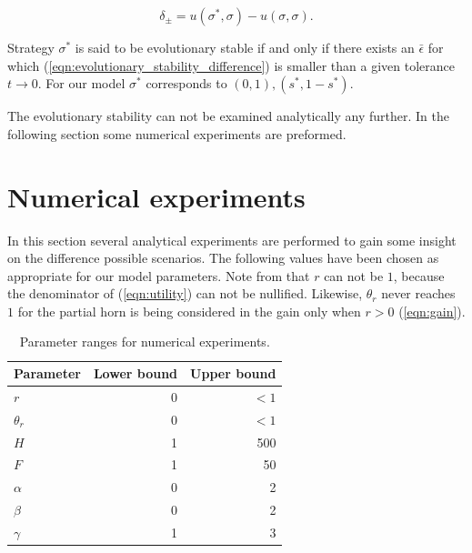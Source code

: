 \documentclass[10pt]{article}
\begin{document}
\begin{equation}\label{eqn:evolutionary_stability_difference}
	 \delta_{\pm} = u(\sigma^*, \sigma) - u(\sigma, \sigma).
\end{equation}

Strategy \(\sigma^*\) is said to be evolutionary stable if and only if there exists
an \(\bar{\epsilon}\) for which (\ref{eqn:evolutionary_stability_difference}) is
smaller than a given tolerance \(t \rightarrow 0\).  For our model \(\sigma^*\) 
corresponds to \((0, 1), (s^*, 1 - s^*)\).

The evolutionary stability can not be examined analytically any further. In the 
following section some numerical experiments are preformed. 

\section{Numerical experiments}\label{section:numerical_experiments}

In this section several analytical experiments are performed to gain some insight 
on the difference possible scenarios. The following values have been chosen as
appropriate for our model parameters. Note from that \(r\) can not be \(1\), because 
the denominator of (\ref{eqn:utility}) can not be nullified. Likewise,  \(\theta_r\)
never reaches \(1\) for the partial horn is being considered in the gain only when 
\(r>0\) (\ref{eqn:gain}). 

\begin{table}[!hbtp]
	\begin{center}
      \begin{tabular}{lrr}
            \toprule
            Parameter    	& Lower bound & Upper bound\\
            \midrule
            \(r\)				& 0				& \(< 1\)		\\
            \(\theta_r\)    	& 0				&  \(< 1\)		\\
            \(H\)              	& 1				& 500			\\
            \(F\)              	& 1				& 50			\\
            \(\alpha\)      	& 0				& 2				\\
            \(\beta\)        	& 0  	            & 2				\\
            \(\gamma\)  	& 1				& 3				\\
            \bottomrule
      \end{tabular}
      \caption{Parameter ranges for numerical experiments.}
      \label{tbl:paremeters}
  	\end{center}
\end{table}
\end{document}

